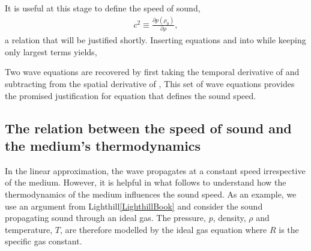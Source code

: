 It is useful at this stage to define the speed of sound,
\begin{align}
  \label{eqn:csquaredApprox}
c^2 \equiv \frac{\partial p(\rho_0)}{\partial \rho},
\end{align}
a relation that will be justified shortly. %
%
Inserting equations  and  into 
while keeping only largest terms yields,

Two wave equations are recovered by first taking the temporal derivative of  and subtracting from the spatial derivative of
,
This set of wave equations provides the promised justification for equation  that defines the sound speed.

\subsection{The relation between the speed of sound and the medium's thermodynamics}
In the linear approximation, the wave propagates at a constant speed irrespective of the medium.
However, it is helpful in what follows to understand how the thermodynamics of the medium influences the sound speed.
As an example, we use an argument from Lighthill\ref{LighthillBook}
and consider the sound propagating sound through an ideal gas.
The pressure, $p$, density, $\rho$ and temperature, $T$, are therefore modelled by the ideal gas equation
where $R$ is the specific gas constant.

